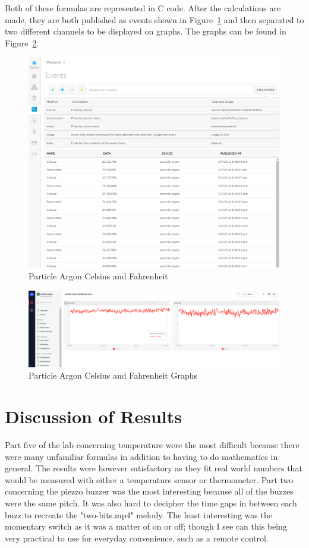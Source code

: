 \documentclass{article}
\begin{document}
Both of these formulas are represented in C code. After the calculations are made, they are both published as events shown in Figure~\ref{fig:temperaturevalues} and then separated to two different channels to be displayed on graphs. The graphs can be found in Figure~\ref{fig:temperaturegraphs}.
\begin{figure}[H]
\center
\includegraphics[width=\textwidth]{images/celsius-fahrenheit.png}
\caption{Particle Argon Celsius and Fahrenheit}
\label{fig:temperaturevalues}
\end{figure}

\begin{figure}[H]
\center
\includegraphics[width=\textwidth]{images/celsius-fahrenheit-graphs.png}
\caption{Particle Argon Celsius and Fahrenheit Graphs}
\label{fig:temperaturegraphs}
\end{figure}

\newpage

\section{Discussion of Results}
Part five of the lab concerning temperature were the most difficult because there were many unfamiliar formulas in addition to having to do mathematics in general. The results were however satisfactory as they fit real world numbers that would be measured with either a temperature sensor or thermometer. Part two concerning the piezzo buzzer was the most interesting because all of the buzzes were the same pitch. It was also hard to decipher the time gaps in between each buzz to recreate the "two-bits.mp4" melody. The least interesting was the momentary switch as it was a matter of on or off; though I see can this being very practical to use for everyday convenience, such as a remote control.
\end{document}
